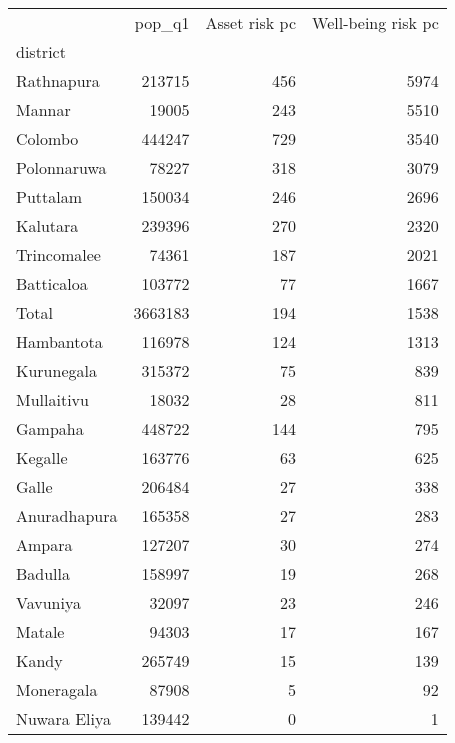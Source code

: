 \begin{tabular}{lrrr}
\toprule
{} &   pop\_q1 &  Asset risk pc &  Well-being risk pc \\
district     &          &                &                     \\
\midrule
Rathnapura   &   213715 &            456 &                5974 \\
Mannar       &    19005 &            243 &                5510 \\
Colombo      &   444247 &            729 &                3540 \\
Polonnaruwa  &    78227 &            318 &                3079 \\
Puttalam     &   150034 &            246 &                2696 \\
Kalutara     &   239396 &            270 &                2320 \\
Trincomalee  &    74361 &            187 &                2021 \\
Batticaloa   &   103772 &             77 &                1667 \\
Total        &  3663183 &            194 &                1538 \\
Hambantota   &   116978 &            124 &                1313 \\
Kurunegala   &   315372 &             75 &                 839 \\
Mullaitivu   &    18032 &             28 &                 811 \\
Gampaha      &   448722 &            144 &                 795 \\
Kegalle      &   163776 &             63 &                 625 \\
Galle        &   206484 &             27 &                 338 \\
Anuradhapura &   165358 &             27 &                 283 \\
Ampara       &   127207 &             30 &                 274 \\
Badulla      &   158997 &             19 &                 268 \\
Vavuniya     &    32097 &             23 &                 246 \\
Matale       &    94303 &             17 &                 167 \\
Kandy        &   265749 &             15 &                 139 \\
Moneragala   &    87908 &              5 &                  92 \\
Nuwara Eliya &   139442 &              0 &                   1 \\
\bottomrule
\end{tabular}
